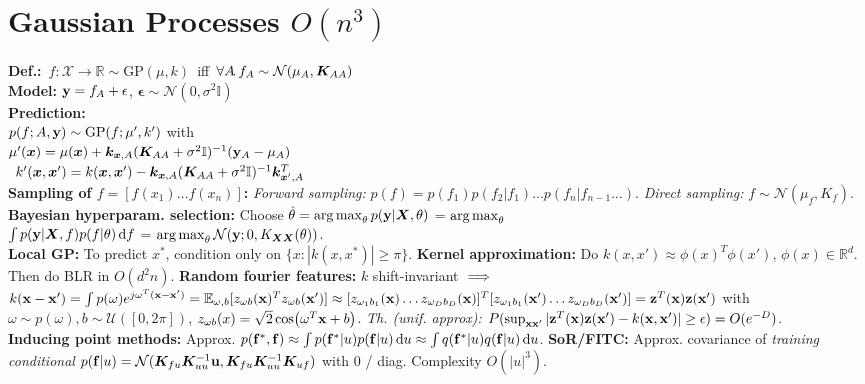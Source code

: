 \section{Gaussian Processes $O(n^3)$}
\mbox{\textbf{Def.:} $f: \mathcal{X} \rightarrow \mathbb{R} \sim \mathrm{GP}(\mu, k)$ iff $\forall A\!.\, f_A \sim \mathcal{N}(\mu_A, {\bm{K}}_{AA})$}\\
\textbf{Model:} 
${\mathbf{y}} = f_A + \mathbf{\epsilon}$, $\mathbf{\epsilon} \sim \mathcal{N}(0, \sigma^2\mathbb{I})$\\
\textbf{Prediction:}\\
$p(f;A,{\mathbf{y}}) \sim \mathrm{GP}(f;\mu', k')$ with\\
\mbox{\hspace{-0em}$\mu'({\bm{x}}) = \mu({\bm{x}}) + {\bm{k}}_{{\bm{x}},A}({\bm{K}}_{AA} + \sigma^2\mathbb{I})^{-1}({\mathbf{y}}_A - \mu_A)$}\\
\mbox{\hspace{-0em}
$k'({\bm{x}},{\bm{x}}') = k({\bm{x}},{\bm{x}}') - {\bm{k}}_{{\bm{x}},A}({\bm{K}}_{AA}+\sigma^2\mathbb{I})^{-1}{\bm{k}}^T_{{\bm{x}}',A}$}\\
\textbf{Sampling of $f = [f(x_1)\ldots f(x_n)]$:} \emph{Forward sampling:} $p(f) = p(f_1)p(f_2|f_1)\ldots p(f_n|f_{n-1}\ldots)$.
\emph{Direct sampling:} $f\sim\mathcal{N}(\mu_f, K_f)$. 
\textbf{Bayesian hyperparam. selection:} Choose $\hat{\theta}=\operatorname*{arg\,max}_{\theta}p({\mathbf{y}}|{\bm{X}},\theta)$ = $\operatorname*{arg\,max}_{\theta}$\\$\int p({\mathbf{y}}|{\bm{X}},f)p(f|\theta)\dd{f}$ = $\operatorname*{arg\,max}_{\theta}\mathcal{N}({\mathbf{y}};0,K_{{\bm{X}}{\bm{X}}}(\theta))$.\\
\textbf{Local GP:} To predict $x^*$, condition only on $\{x:|k(x,x^*)|\geq\pi\}$.
\textbf{Kernel approximation:} Do $k(x,x')\approx\phi(x)^T\phi(x')$, $\phi(x)\in\mathbb{R}^d$. Then do BLR in $O(d^2n)$.
\textbf{Random fourier features:} $k$ shift-invariant $\color{black} \implies$ $k({\mathbf{x}}-{\mathbf{x}}') = \int p(\omega)e^{j\omega^T({\mathbf{x}}-{\mathbf{x}}')} = \mathbb{E}_{\omega,b}[z_{\omega b}({\mathbf{x}})^Tz_{\omega b}({\mathbf{x}}')] \approx [z_{\omega_1b_1}({\mathbf{x}})\ldots z_{\omega_Db_D}({\mathbf{x}})]^T[z_{\omega_1b_1}({\mathbf{x}}')\ldots z_{\omega_Db_D}({\mathbf{x}}')] = {\mathbf{z}}^T({\mathbf{x}}){\mathbf{z}}({\mathbf{x}}')$ with $\omega\sim p(\omega), b\sim\mathcal{U}([0,2\pi])$, $z_{\omega b}(x) = \sqrt{2}\cos(\omega^T{\mathbf{x}} + b)$. \emph{Th. (unif. approx):} $P(\sup_{{\mathbf{x}}{\mathbf{x}}'}|{\mathbf{z}}^T({\mathbf{x}}){\mathbf{z}}({\mathbf{x}}')-k({\mathbf{x}},{\mathbf{x}}')|\geq\epsilon) = O(e^{-D})$.\\
\textbf{Inducing point methods:} Approx. $p({\mathbf{f}}^*,{\mathbf{f}})\approx\int p({\mathbf{f}}^*|u)p({\mathbf{f}}|u)\dd{u}\approx\int q({\mathbf{f}}^*|u)q({\mathbf{f}}|u)\dd{u}$. \textbf{SoR/FITC:} Approx. covariance of \emph{training conditional} $p({\mathbf{f}}|u)=\mathcal{N}({\bm{K}}_{fu}{\bm{K}}_{uu}^{-1}{\mathbf{u}}, {\bm{K}}_{fu}{\bm{K}}_{uu}^{-1}{\bm{K}}_{uf})$ with 0 / diag. Complexity $O(|u|^3)$.

